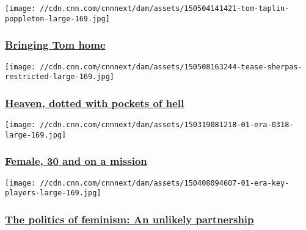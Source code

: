 \href{http://www.cnn.com/interactive/2015/05/world/everest-friendship/}{}

\texttt{[image: //cdn.cnn.com/cnnnext/dam/assets/150504141421-tom-taplin-poppleton-large-169.jpg]}

\hypertarget{bringing-tom-home}{%
\subsubsection{\texorpdfstring{\href{http://www.cnn.com/interactive/2015/05/world/everest-friendship/}{Bringing
Tom home}}{Bringing Tom home}}\label{bringing-tom-home}}

\href{/2015/05/08/world/nepal-forgotten-sherpas-remote-village-everest/index.html}{}

\texttt{[image: //cdn.cnn.com/cnnnext/dam/assets/150508163244-tease-sherpas-restricted-large-169.jpg]}

\hypertarget{heaven-dotted-with-pockets-of-hell}{%
\subsubsection{\texorpdfstring{\href{/2015/05/08/world/nepal-forgotten-sherpas-remote-village-everest/index.html}{Heaven,
dotted with pockets of
hell}}{Heaven, dotted with pockets of hell}}\label{heaven-dotted-with-pockets-of-hell}}

\href{/2015/04/02/us/new-womens-equal-rights-movement/index.html}{}

\texttt{[image: //cdn.cnn.com/cnnnext/dam/assets/150319081218-01-era-0318-large-169.jpg]}

\hypertarget{female-30-and-on-a-mission}{%
\subsubsection{\texorpdfstring{\href{/2015/04/02/us/new-womens-equal-rights-movement/index.html}{Female,
30 and on a
mission}}{Female, 30 and on a mission}}\label{female-30-and-on-a-mission}}

\href{/2015/04/09/us/era-womens-movement-unlikely-partners/index.html}{}

\texttt{[image: //cdn.cnn.com/cnnnext/dam/assets/150408094607-01-era-key-players-large-169.jpg]}

\hypertarget{the-politics-of-feminism-an-unlikely-partnership}{%
\subsubsection{\texorpdfstring{\href{/2015/04/09/us/era-womens-movement-unlikely-partners/index.html}{The
politics of feminism: An unlikely
partnership}}{The politics of feminism: An unlikely partnership}}\label{the-politics-of-feminism-an-unlikely-partnership}}

